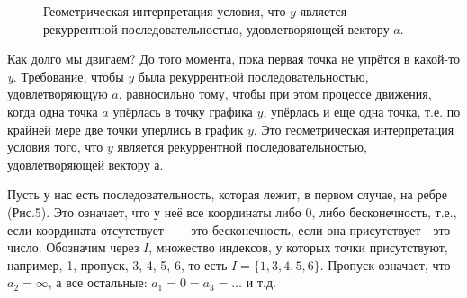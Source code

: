 \documentclass[russian]{lecture-notes}
\begin{document}
\begin{figure}[h!]
\caption{Геометрическая интерпретация условия, что $y$ является рекуррентной последовательностью, удовлетворяющей вектору $a$.}
\end{figure}

Как долго мы двигаем? До того момента, пока первая точка не упрётся в какой-то {\itshape y}.
Требование, чтобы $y$ была рекуррентной последовательностью, удовлетворяющую $a$, равносильно тому, чтобы при этом процессе движения, когда одна точка $a$ упёрлась в точку графика $y$, упёрлась и еще одна точка, т.е. по крайней мере две точки уперлись в график $y$. Это геометрическая интерпретация условия того, что $y$ является рекуррентной последовательностью, удовлетворяющей вектору $а$.

Пусть у нас есть последовательность, которая лежит, в первом случае, на ребре (Рис.5). Это означает, что у неё все координаты либо 0, либо бесконечность, т.е., если координата отсутствует ~--- это бесконечность, если она присутствует - это число. Обозначим через $I$, множество индексов, у которых точки присутствуют, например, 1, пропуск, 3, 4, 5, 6, то есть $I=\{1,3,4,5,6\}$. Пропуск означает, что $a_2=\infty$, а все остальные: $a_1=0=a_3=\ldots$ и т.д.
\end{document}
